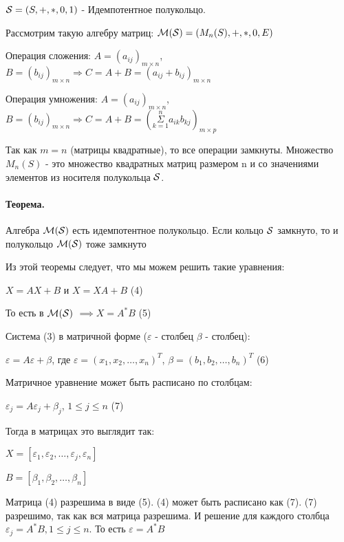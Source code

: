 \documentclass{report}
\begin{document}
\medskip

${\cal S} = (S, +, *, 0, 1)$ - Идемпотентное полукольцо.

Рассмотрим такую алгебру матриц: ${\cal M(S)} = (M_n(S), +, *, 0, E)$

\medskip

Операция сложения:
$A = (a_{ij})_{m \times n}$, $B = (b_{ij})_{m \times n} \Rightarrow
	C = A + B = (a_{ij} + b_{ij})_{m \times n}$

Операция умножения:
$A = (a_{ij})_{m \times n}$, $B = (b_{ij})_{m \times n} \Rightarrow
	C = A + B = (\underset{k=1}{\overset{n}{\Sigma}}a_{ik}b_{kj})_{m \times p}$

\medskip

Так как $m = n$ (матрицы квадратные), то все операции замкнуты. Множество $M_n(S)$ -
это множество квадратных матриц размером n и со значениями элементов из носителя полукольца $\cal S$.

\paragraph*{Теорема.}
Алгебра $\cal M(S)$ есть идемпотентное полукольцо. Если  кольцо $\cal S$ замкнуто, то и полукольцо  $\cal M(S)$ тоже
замкнуто

\medskip

Из этой теоремы следует, что мы можем решить такие уравнения:

$X = AX + B$ и  $X = XA + B$ (4)

То есть в  $\cal M(S)$ $\implies X = A^{*}B$ (5)


\medskip

Система (3) в матричной форме ($\varepsilon$ - столбец  $\beta$ - столбец):

$\varepsilon = A\varepsilon + \beta$, где $\varepsilon = (x_1, x_2, \ldots, x_{n})^{T}$,
$\beta = (b_1,b_2,\ldots,b_{n})^{T}$ (6)


\medskip

Матричное уравнение может быть расписано по столбцам:

$\varepsilon_j = A\varepsilon_j + \beta_j$,  $1 \le j \le n$ (7)


Тогда в матрицах это выглядит так:

$X = [\varepsilon_1, \varepsilon_2, \ldots, \varepsilon_j, \varepsilon_n]$

$B = [\beta_1, \beta_2, \ldots, \beta_{n}]$

\medskip

Матрица (4) разрешима в виде (5). (4) может быть расписано как (7). (7) разрешимо, так как
вся матрица разрешима. И решение для каждого столбца $\varepsilon_{j} = A^{*}B, 1\le j\le n$. То есть
$\varepsilon = A^{*}B$
\end{document}
